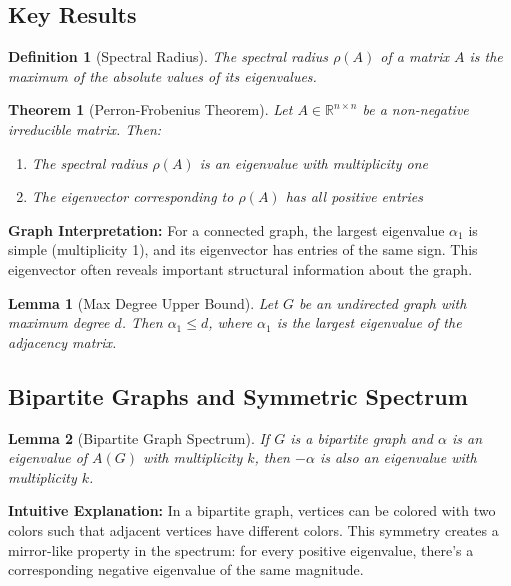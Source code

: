 \documentclass[11pt]{article}
\newtheorem{theorem}{Theorem}
\newtheorem{lemma}{Lemma}
\newtheorem{definition}{Definition}
\begin{document}
\subsection{Key Results}

\begin{definition}[Spectral Radius]
The spectral radius $\rho(A)$ of a matrix $A$ is the maximum of the absolute values of its eigenvalues.
\end{definition}

\begin{theorem}[Perron-Frobenius Theorem]
Let $A \in \mathbb{R}^{n \times n}$ be a non-negative irreducible matrix. Then:
\begin{enumerate}
\item The spectral radius $\rho(A)$ is an eigenvalue with multiplicity one
\item The eigenvector corresponding to $\rho(A)$ has all positive entries
\end{enumerate}
\end{theorem}

\textbf{Graph Interpretation:} For a connected graph, the largest eigenvalue $\alpha_1$ is simple (multiplicity 1), and its eigenvector has entries of the same sign. This eigenvector often reveals important structural information about the graph.

\begin{lemma}[Max Degree Upper Bound]
Let $G$ be an undirected graph with maximum degree $d$. Then $\alpha_1 \leq d$, where $\alpha_1$ is the largest eigenvalue of the adjacency matrix.
\end{lemma}

\subsection{Bipartite Graphs and Symmetric Spectrum}

\begin{lemma}[Bipartite Graph Spectrum]
If $G$ is a bipartite graph and $\alpha$ is an eigenvalue of $A(G)$ with multiplicity $k$, then $-\alpha$ is also an eigenvalue with multiplicity $k$.
\end{lemma}

\textbf{Intuitive Explanation:} In a bipartite graph, vertices can be colored with two colors such that adjacent vertices have different colors. This symmetry creates a mirror-like property in the spectrum: for every positive eigenvalue, there's a corresponding negative eigenvalue of the same magnitude.
\end{document}
